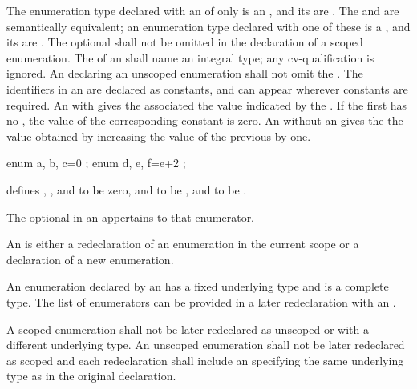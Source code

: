 \pnum
{}%
The enumeration type declared with an 
of only  is an ,
and its  are .
The   and
 are semantically equivalent; an enumeration
type declared with one of these is a ,
and its  are .
The optional  shall not be omitted in the declaration of a scoped enumeration.
The  of an 
shall name an integral type; any cv-qualification is ignored.
An  declaring an unscoped enumeration shall
not omit the .
The identifiers in an  are declared as
constants, and can appear wherever constants are required.
%
An  with \tcode{=} gives the associated
 the value indicated by the
.
If the first 
has no , the value of the corresponding constant
is zero. An  without an
 gives the  the value
obtained by increasing the value of the previous 
by one.
\begin{example}

\begin{codeblock}
enum { a, b, c=0 };
enum { d, e, f=e+2 };
\end{codeblock}

defines , , and  to be zero,  and
 to be , and  to be .
\end{example}
The optional  in an
 appertains to that enumerator.

\pnum
An  is either a redeclaration
of an enumeration in the current scope or a declaration of a new enumeration.
\begin{note} An enumeration declared by an
 has a fixed underlying type and is a
complete type. The list of enumerators can be provided in a later redeclaration
with an . \end{note} A scoped enumeration
shall not be later redeclared as unscoped or with a different underlying type.
An unscoped enumeration shall not be later redeclared as scoped and each
redeclaration shall include an  specifying the same
underlying type as in the original declaration.


